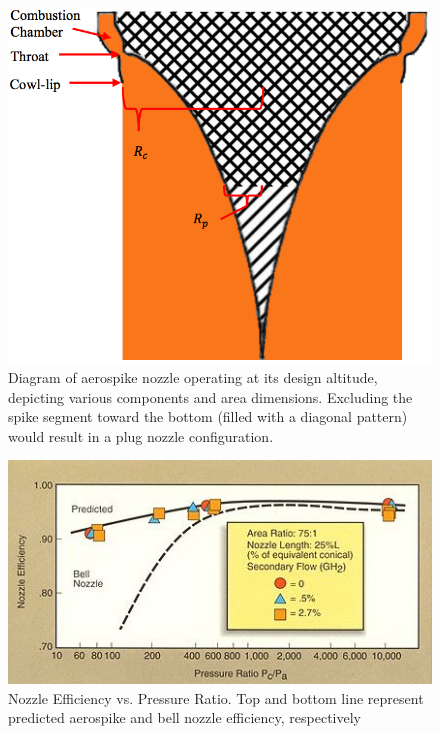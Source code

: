 \documentclass[conference]{IEEEtran} %
\begin{document}
	\begin{figure}
		\centering
		\includegraphics[width=0.75\columnwidth]{figs/aerospike.png}
		\caption{Diagram of aerospike nozzle operating at its design altitude, depicting various components and area dimensions. Excluding the spike segment toward the bottom (filled with a diagonal pattern) would result in a plug nozzle configuration.}
		\label{fig:aerospike}
	\end{figure}
	
	\begin{figure}
		\centering
		\includegraphics[width=\columnwidth]{figs/ASvsCBN_NozzleDesign.jpg}
		\caption{Nozzle Efficiency vs. Pressure Ratio. Top and bottom line represent predicted aerospike and bell nozzle efficiency, respectively}
		\label{fig:1}
	\end{figure}
	
\end{document}
